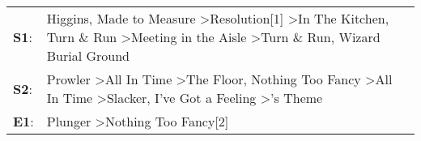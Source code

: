 \begin{supertabular}{p{0.03\textwidth}p{0.92\textwidth}}
 \textbf{S1}:  &  Higgins\textsuperscript{}, \enspace Made to Measure\textsuperscript{} \textgreater \enspace Resolution[1]\textsuperscript{} \textgreater \enspace In The Kitchen\textsuperscript{}, \enspace Turn \& Run\textsuperscript{} \textgreater \enspace Meeting in the Aisle\textsuperscript{} \textgreater \enspace Turn \& Run\textsuperscript{}, \enspace Wizard Burial Ground\textsuperscript{}  \enspace  \\
 \textbf{S2}:  &           Prowler\textsuperscript{} \textgreater \enspace All In Time\textsuperscript{} \textgreater \enspace The Floor\textsuperscript{}, \enspace Nothing Too Fancy\textsuperscript{} \textgreater \enspace All In Time\textsuperscript{} \textgreater \enspace Slacker\textsuperscript{}, \enspace I've Got a Feeling\textsuperscript{} \textgreater {}'s Theme\textsuperscript{}  \enspace  \\
 \textbf{E1}:  &                                                                                                                                                                                                                                                                                                        Plunger\textsuperscript{} \textgreater \enspace Nothing Too Fancy[2]\textsuperscript{}  \enspace  \\
\end{supertabular}
